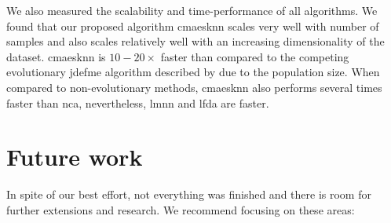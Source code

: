 \documentclass[12pt,a4paper]{report}
\begin{document}
We also measured the scalability and time-performance of all algorithms. We found that our proposed algorithm \ac{cmaesknn} scales very well with number of samples and also scales relatively well with an increasing dimensionality of the dataset. \ac{cmaesknn} is $10-20\times$ faster than compared to the competing evolutionary \ac{jdefme} algorithm described by \cite{fukui2013evolutionary} due to the population size. When compared to non-evolutionary methods, \ac{cmaesknn} also performs several times faster than \ac{nca}, nevertheless, \ac{lmnn} and \ac{lfda} are faster.


\chapter*{Future work} \label{chap:future-work}


In spite of our best effort, not everything was finished and there is room for further extensions and research. We recommend focusing on these areas:
\end{document}
